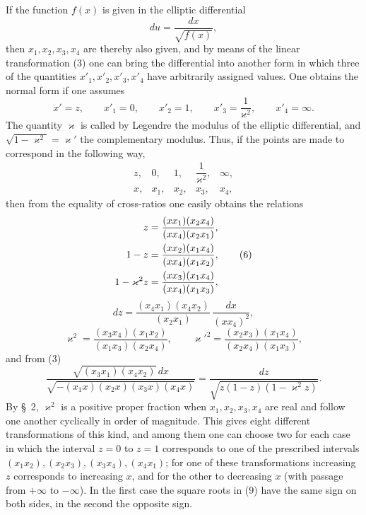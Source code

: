 \documentclass[11pt]{article}
\begin{document}
If the function $f(x)$ is given in the elliptic differential
\[
du=\frac{dx}{\sqrt{f(x)}},
\]
then $x_1,x_2,x_3,x_4$ are thereby also given, and by means of the linear transformation (3) one can bring the differential into another form in which three of the quantities $x'_1,x'_2,x'_3,x'_4$ have arbitrarily assigned values. One obtains the normal form if one assumes
\[
x'=z,\qquad x'_1=0,\qquad x'_2=1,\qquad x'_3=\frac{1}{\varkappa^2},\qquad x'_4=\infty.
\]
The quantity $\varkappa$ is called by Legendre the modulus of the elliptic differential, and $\sqrt{1-\varkappa^2}=\varkappa'$ the complementary modulus. Thus, if the points are made to correspond in the following way,
\[
\begin{array}{ccccc}
z,&0,&1,&\dfrac{1}{\varkappa^2},&\infty,\\[0.4em]
x,&x_1,&x_2,&x_3,&x_4,
\end{array}
\]
then from the equality of cross-ratios one easily obtains the relations
\begin{align}
z&=\frac{(xx_1)(x_2x_4)}{(xx_4)(x_2x_1)},\notag\\
1-z&=\frac{(xx_2)(x_1x_4)}{(xx_4)(x_1x_2)},\tag{6}\\
1-\varkappa^2z&=\frac{(xx_3)(x_1x_4)}{(xx_4)(x_1x_3)},\notag
\end{align}
\begin{equation}
dz=\frac{(x_4x_1)(x_4x_2)}{(x_2x_1)}\,\frac{dx}{(xx_4)^2},
\tag{7}
\end{equation}
\begin{equation}
\varkappa^2=\frac{(x_3x_4)(x_1x_2)}{(x_1x_3)(x_2x_4)},\qquad
\varkappa'^2=\frac{(x_2x_3)(x_1x_4)}{(x_2x_4)(x_1x_3)},
\tag{8}
\end{equation}
and from (3)
\begin{equation}
\frac{\sqrt{(x_3x_1)(x_4x_2)}\,dx}{\sqrt{-(x_1x)(x_2x)(x_3x)(x_4x)}}=
\frac{dz}{\sqrt{z(1-z)(1-\varkappa^2z)}}.
\tag{9}
\end{equation}
By \S~2, $\varkappa^2$ is a positive proper fraction when $x_1,x_2,x_3,x_4$ are real and follow one another cyclically in order of magnitude. This gives eight different transformations of this kind, and among them one can choose two for each case in which the interval $z=0$ to $z=1$ corresponds to one of the prescribed intervals $(x_1x_2),(x_2x_3),(x_3x_4),(x_4x_1)$; for one of these transformations increasing $z$ corresponds to increasing $x$, and for the other to decreasing $x$ (with passage from $+\infty$ to $-\infty$). In the first case the square roots in (9) have the same sign on both sides, in the second the opposite sign.
\end{document}
